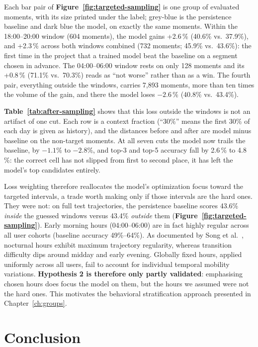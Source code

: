 Each bar pair of \textbf{Figure~\ref{fig:targeted-sampling}} is one group of evaluated moments, with its size printed under the label; grey-blue is the persistence baseline and dark blue the model, on exactly the same moments. Within the 18:00--20:00 window (604 moments), the model gains +2.6\,\% (40.6\% vs.\ 37.9\%), and +2.3\,\% across both windows combined (732 moments; 45.9\% vs.\ 43.6\%): the first time in the project that a trained model beat the baseline on a segment chosen in advance. The 04:00--06:00 window rests on only 128 moments and its +0.8\,\% (71.1\% vs.\ 70.3\%) reads as ``not worse'' rather than as a win. The fourth pair, everything outside the windows, carries 7,893 moments, more than ten times the volume of the gain, and there the model loses $-2.6$\,\% (40.8\% vs.\ 43.4\%).

\textbf{Table~\ref{tab:after-sampling}} shows that this loss outside the windows is not an artifact of one cut. Each row is a context fraction (``30\%'' means the first 30\% of each day is given as history), and the distances before and after are model minus baseline on the non-target moments. At all seven cuts the model now trails the baseline, by $-1.1\%$ to $-2.8\%$, and top-3 and top-5 accuracy fall by 2.6\,\% to 4.8\,\%: the correct cell has not slipped from first to second place, it has left the model's top candidates entirely.

Loss weighting therefore reallocates the model's optimization focus toward the targeted intervals, a trade worth making only if those intervals are the hard ones. They were not: on full test trajectories, the persistence baseline scores 43.6\% \emph{inside} the guessed windows versus 43.4\% \emph{outside} them (\textbf{Figure~\ref{fig:targeted-sampling}}). Early morning hours (04:00--06:00) are in fact highly regular across all user cohorts (baseline accuracy 49\%--64\%). As documented by Song et al.\ \textbf{\cite{song2010limits}}, nocturnal hours exhibit maximum trajectory regularity, whereas transition difficulty dips around midday and early evening. Globally fixed hours, applied uniformly across all users, fail to account for individual temporal mobility variations. \textbf{Hypothesis 2 is therefore only partly validated}: emphasising chosen hours does focus the model on them, but the hours we assumed were not the hard ones. This motivates the behavioral stratification approach presented in Chapter~\ref{ch:groups}.

\section{Conclusion}
\label{sec:retro-time}

